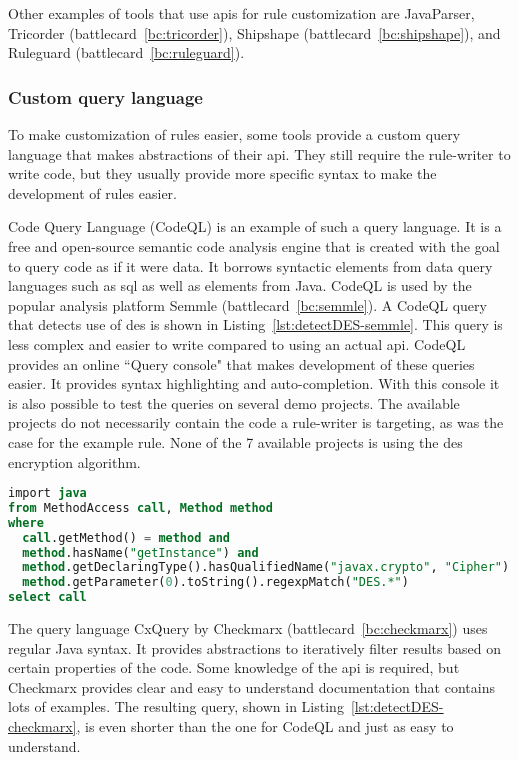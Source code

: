 Other examples of tools that use \glspl{api} for rule customization are JavaParser, Tricorder (battlecard~\ref{bc:tricorder}), Shipshape (battlecard~\ref{bc:shipshape}), and Ruleguard (battlecard~\ref{bc:ruleguard}).

\subsubsection{Custom query language}
To make customization of rules easier, some tools provide a custom query language that makes abstractions of their \gls{api}.
They still require the rule-writer to write code, but they usually provide more specific syntax to make the development of rules easier.

Code Query Language (CodeQL) is an example of such a query language.
It is a free and open-source semantic code analysis engine that is created with the goal to query code as if it were data.
It borrows syntactic elements from data query languages such as \gls{sql} as well as elements from Java.
CodeQL is used by the popular analysis platform Semmle (battlecard~\ref{bc:semmle}).
A CodeQL query that detects use of \gls{des} is shown in Listing~\ref{lst:detectDES-semmle}.
This query is less complex and easier to write compared to using an actual \gls{api}.
CodeQL provides an online ``Query console" that makes development of these queries easier.
It provides syntax highlighting and auto-completion.
With this console it is also possible to test the queries on several demo projects.
The available projects do not necessarily contain the code a rule-writer is targeting, as was the case for the example rule.
None of the 7 available projects is using the \gls{des} encryption algorithm.

\begin{lstlisting}[language={sql},caption={CodeQL query used by Semmle to find use of insecure algorithm DES.},label={lst:detectDES-semmle},float,abovecaptionskip=-0.0pt,xleftmargin=15pt]
import java
from MethodAccess call, Method method
where
  call.getMethod() = method and
  method.hasName("getInstance") and
  method.getDeclaringType().hasQualifiedName("javax.crypto", "Cipher") and
  method.getParameter(0).toString().regexpMatch("DES.*")
select call
\end{lstlisting}

The query language CxQuery by Checkmarx (battlecard~\ref{bc:checkmarx}) uses regular Java syntax.
It provides abstractions to iteratively filter results based on certain properties of the code.
Some knowledge of the \gls{api} is required, but Checkmarx provides  clear and easy to understand documentation that contains lots of examples.
The resulting query, shown in Listing~\ref{lst:detectDES-checkmarx}, is even shorter than the one for CodeQL and just as easy to understand.

